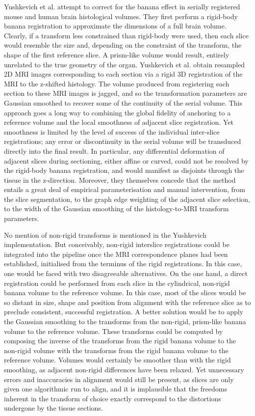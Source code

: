   Yushkevich et al. attempt to correct for the banana effect in serially registered mouse \cite{Yushkevich2006} and human \cite{Adler2012} brain histological volumes. They first perform a rigid-body banana registration to approximate the dimensions of a full brain volume. Clearly, if a transform less constrained than rigid-body were used, then each slice would resemble the size and, depending on the constraint of the transform, the shape of the first reference slice. A prism-like volume would result, entirely unrelated to the true geometry of the organ. Yushkevich et al. obtain resampled 2D MRI images corresponding to each section via a rigid 3D registration of the MRI to the z-shifted histology. The volume produced from registering each section to these MRI images is jagged, and so the transformation parameters are Gaussian smoothed to recover some of the continuity of the serial volume. This approach goes a long way to combining the global fidelity of anchoring to a reference volume and the local smoothness of adjacent slice registration. Yet smoothness is limited by the level of success of the individual inter-slice registrations; any error or discontinuity in the serial volume will be transduced directly into the final result. In particular, any differential deformation of adjacent slices during sectioning, either affine or curved, could not be resolved by the rigid-body banana registration, and would manifest as disjoints through the tissue in the z-direction. Moreover, they themselves concede that the method entails a great deal of empirical parameterisation and manual intervention, from the slice segmentation, to the graph edge weighting of the adjacent slice selection, to the width of the Gaussian smoothing of the histology-to-MRI transform parameters.
  
  No mention of non-rigid transforms is mentioned in the Yushkevich implementation. But conceivably, non-rigid interslice registrations could be integrated into the pipeline once the MRI correspondence planes had been established, initialised from the terminus of the rigid registrations. In this case, one would be faced with two disagreeable alternatives. On the one hand, a direct registration could be performed from each slice in the cylindrical, non-rigid banana volume to the reference volume. In this case, most of the slices would be so distant in size, shape and position from alignment with the reference slice as to preclude consistent, successful registration. A better solution would be to apply the Gaussian smoothing to the transforms from the non-rigid, prism-like banana volume to the reference volume. These transforms could be computed by composing the inverse of the transforms from the rigid banana volume to the non-rigid volume with the transforms from the rigid banana volume to the reference volume. Volumes would certainly be smoother than with the rigid smoothing, as adjacent non-rigid differences have been relaxed. Yet unnecessary errors and inaccuracies in alignment would still be present, as slices are only given one algorithmic run to align, and it is implausible that the freedoms inherent in the transform of choice exactly correspond to the distortions undergone by the tissue sections.
  
